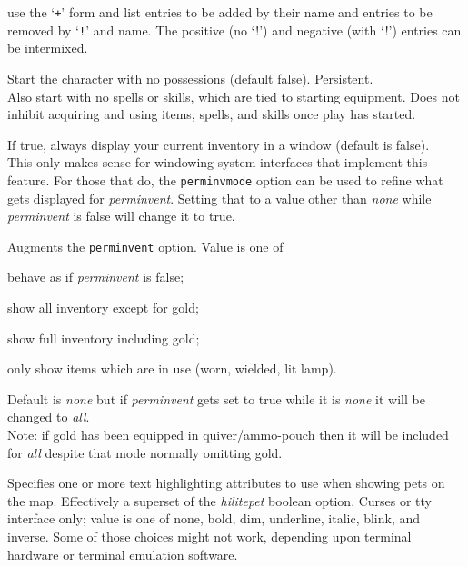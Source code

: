 \documentclass[titlepage]{article}
\begin{document}
\begin{description}[font=\mdseries\itshape]
use the `\texttt{+}' form and list entries to be added by their name
and entries to be removed by `\texttt{!}' and name.
The positive (no `!') and negative (with `!') entries
can be intermixed.
\item[pauper]
Start the character with no possessions (default false).  Persistent.
\\
Also start with no spells or skills, which are tied to starting equipment.
Does not inhibit acquiring and using items, spells, and skills once play
has started.
\item[perm\textunderscore invent]
If true, always display your current inventory in a window (default is false).
\\
This only
makes sense for windowing system interfaces that implement this feature.
For those that do, the
\texttt{perminv\textunderscore mode}
option can be used to refine what gets displayed
for \textit{perm\textunderscore invent}.
Setting that to a value other than \textit{none}
while \textit{perm\textunderscore invent} is false will change it to true.
\item[perminv\textunderscore mode]
Augments the
\texttt{perm\textunderscore invent}
option.
Value is one of
\addtolength{\pcwidth}{\labelsep}
\begin{description}[leftmargin=\pcwidth, topsep=1mm, itemsep=0mm, labelwidth=*, font=\mdseries, align=right]
\item[\texttt{none}]
behave as if \textit{perm\textunderscore invent} is false;
\item[{all}]
show all inventory except for gold;
\item[{full}]
show full inventory including gold;
\item[{in-use}]
only show items which are in use (worn, wielded, lit lamp).
\end{description}
Default is \textit{none} but if \textit{perm\textunderscore invent} gets set to true
while it is \textit{none} it will be changed to \textit{all}.
\\
Note: if gold has been equipped in quiver/ammo-pouch then it will be
included for \textit{all} despite that mode normally omitting gold.
\item[petattr]
Specifies one or more text highlighting attributes to use when showing
pets on the map.
Effectively a superset of the \textit{hilite\textunderscore pet} boolean option.
Curses or tty interface only; value is one of
none, bold, dim, underline, italic, blink, and inverse.
Some of those choices might not work,
depending upon terminal hardware or terminal emulation software.


\end{description}
\end{document}
